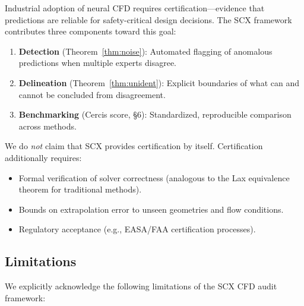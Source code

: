 \documentclass[11pt,a4paper]{article}
\theoremstyle{definition}
\theoremstyle{remark}
\begin{document}
Industrial adoption of neural CFD requires certification---evidence that predictions are reliable for safety-critical design decisions.
The SCX framework contributes three components toward this goal:

\begin{enumerate}[label=(\roman*)]
    \item \textbf{Detection} (Theorem~\ref{thm:noise}): Automated flagging of anomalous predictions when multiple experts disagree.
    \item \textbf{Delineation} (Theorem~\ref{thm:unident}): Explicit boundaries of what can and cannot be concluded from disagreement.
    \item \textbf{Benchmarking} (Cercis score, §6): Standardized, reproducible comparison across methods.
\end{enumerate}

\noindent We do \emph{not} claim that SCX provides certification by itself. Certification additionally requires:
\begin{itemize}[nosep]
    \item Formal verification of solver correctness (analogous to the Lax equivalence theorem for traditional methods).
    \item Bounds on extrapolation error to unseen geometries and flow conditions.
    \item Regulatory acceptance (e.g., EASA/FAA certification processes).
\end{itemize}

\subsection{Limitations}

We explicitly acknowledge the following limitations of the SCX CFD audit framework:
\end{document}
